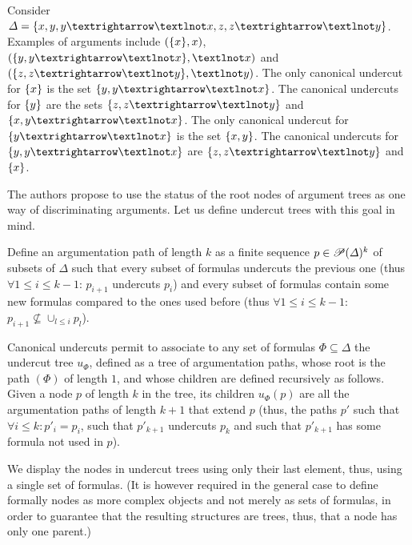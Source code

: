 \documentclass[version=3.21, pagesize, twoside=off, bibliography=totoc, DIV=calc, fontsize=12pt, a4paper, french, english]{scrartcl}
\begin{document}
\begin{example}
	\label{ex:abstract}
	Consider $\Delta = \set{x, y, y → ¬x, z, z → ¬y}$. Examples of arguments include $(\{x\}, x)$, $(\set{y, y → ¬x}, ¬x)$ and $(\set{z, z → ¬y}, ¬y)$. 
	The only canonical undercut for $\{x\}$ is the set $\set{y, y → ¬x}$. 
	The canonical undercuts for $\{y\}$ are the sets $\set{z, z → ¬y}$ and $\set{x, y → ¬x}$. 
	The only canonical undercut for $\set{y → ¬x}$ is the set $\{x, y\}$. 
	The canonical undercuts for $\set{y, y → ¬x}$ are $\set{z, z → ¬y}$ and $\{x\}$.
\end{example}

The authors propose to use the status of the root nodes of argument trees as one way of discriminating arguments. Let us define undercut trees with this goal in mind.

Define an argumentation path of length $k$ as a finite sequence $p \in \mathscr{P}(\Delta)^k$ of subsets of $\Delta$ such that every subset of formulas undercuts the previous one (thus $\forall 1 ≤ i ≤ k - 1$: $p_{i + 1}$ undercuts $p_i$) and every subset of formulas contain some new formulas compared to the ones used before (thus $\forall 1 ≤ i ≤ k - 1$: $p_{i + 1} \nsubseteq \cup_{l ≤ i} p_l$).

Canonical undercuts permit to associate to any set of formulas $\Phi \subseteq \Delta$ the undercut tree $u_\Phi$, defined as a tree of argumentation paths, whose root is the path $(\Phi)$ of length $1$, and whose children are defined recursively as follows. Given a node $p$ of length $k$ in the tree, its children $u_\Phi(p)$ are all the argumentation paths of length $k + 1$ that extend $p$ (thus, the paths $p'$ such that $\forall i ≤ k: p'_i = p_i$, such that $p'_{k + 1}$ undercuts $p_k$ and such that $p'_{k + 1}$ has some formula not used in $p$).

We display the nodes in undercut trees using only their last element, thus, using a single set of formulas. (It is however required in the general case to define formally nodes as more complex objects and not merely as sets of formulas, in order to guarantee that the resulting structures are trees, thus, that a node has only one parent.)
\end{document}
